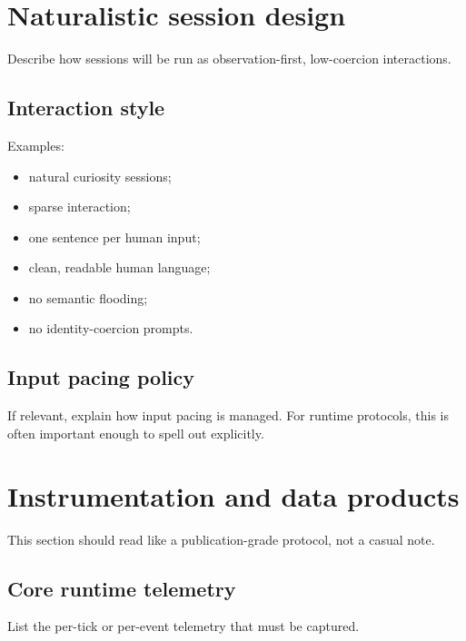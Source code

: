 \documentclass[11pt]{article}
\begin{document}
\section{Naturalistic session design}

Describe how sessions will be run as observation-first, low-coercion interactions.

\subsection{Interaction style}
Examples:
\begin{itemize}[leftmargin=1.5em]
  \item natural curiosity sessions;
  \item sparse interaction;
  \item one sentence per human input;
  \item clean, readable human language;
  \item no semantic flooding;
  \item no identity-coercion prompts.
\end{itemize}

\subsection{Input pacing policy}
If relevant, explain how input pacing is managed. For runtime protocols, this is often important enough to spell out explicitly.

\section{Instrumentation and data products}

This section should read like a publication-grade protocol, not a casual note.

\subsection{Core runtime telemetry}
List the per-tick or per-event telemetry that must be captured.
\end{document}
